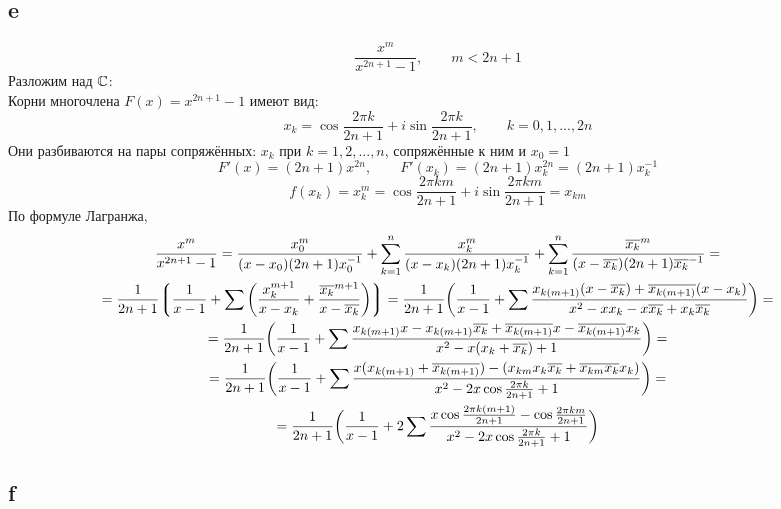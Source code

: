 \subsection{e}

$$ \frac{x^m}{x^{2n +1} - 1}, \qquad m < 2n + 1 $$
Разложим над $ \mathbb{C} $: \\
Корни многочлена $ F(x) = x^{2n + 1} - 1 $ имеют вид:
$$ x_k = \cos \frac{2\pi k}{2n + 1} + i \sin \frac{2\pi k}{2n + 1}, \qquad k = 0, 1, ..., 2n $$
Они разбиваются на пары сопряжённых: $ x_k $ при $ k = 1, 2, ..., n $, сопряжённые к ним и $ x_0 = 1 $
$$ F'(x) = (2n + 1)x^{2n}, \qquad F'(x_k) = (2n + 1)x_k^{2n} = (2n + 1)x_k^{-1} $$
$$ f(x_k) = x_k^m = \cos \frac{2\pi km}{2n + 1} + i \sin \frac{2\pi k m}{2n + 1} = x_{km} $$
По формуле Лагранжа,
\begin{multline*}
    \frac{x^m}{x^{2n + 1} - 1} = \frac{x_0^m}{(x - x_0)(2n + 1)x_0^{-1}} + \sum_{k = 1}^n \frac{x_k^m}{(x - x_k)(2n + 1)x_k^{-1}} + \sum_{k = 1}^n \frac{\overline{x_k}^m}{(x - \overline{x_k})(2n + 1)\overline{x_k}^{-1}} = \\
    = \frac1{2n + 1} \bigg\lgroup \frac1{x - 1} + \sum \bigg( \frac{x_k^{m + 1}}{x - x_k} + \frac{\overline{x_k}^{m + 1}}{x - \overline{x_k}} \bigg) \bigg\rgroup = \frac1{2n + 1} \bigg( \frac1{x - 1} + \sum \frac{x_{k(m + 1)}(x - \overline{x_k}) + \overline{x_{k(m + 1)}}(x - x_k)}{x^2 - xx_k - x\overline{x_k} + x_k\overline{x_k}} \bigg) = \\
    = \frac1{2n + 1} \bigg( \frac1{x - 1} + \sum \frac{x_{k(m + 1)}x - x_{k(m + 1)}\overline{x_k} + \overline{x_{k(m + 1)}}x - \overline{x_{k(m + 1)}}x_k}{x^2 - x(x_k + \overline{x_k}) + 1} \bigg) = \\
    = \frac1{2n + 1} \bigg( \frac1{x - 1} + \sum \frac{x(x_{k(m + 1)} + \overline{x_{k(m + 1)}}) - (x_{km}x_k\overline{x_k} + \overline{x_{km}}\overline{x_k}x_k)}{x^2 - 2x\cos \frac{2\pi k}{2n + 1} + 1} \bigg) = \\
    = \frac1{2n + 1} \bigg( \frac1{x - 1} + 2\sum \frac{x\cos \frac{2\pi k(m + 1)}{2n + 1} - \cos \frac{2\pi km}{2n + 1}}{x^2 - 2x \cos \frac{2\pi k}{2n + 1} + 1} \bigg)
\end{multline*}

\subsection{f}

